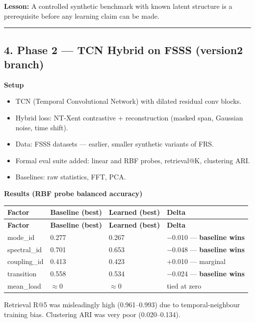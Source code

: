 \documentclass[11pt,a4paper]{article}
\begin{document}
\textbf{Lesson:} A controlled synthetic benchmark with known latent structure is a prerequisite before
any learning claim can be made.

\vspace{4pt}\hrule\vspace{4pt}

\subsection{4. Phase 2 --- TCN Hybrid on FSSS (version2 branch)}

\textbf{Setup}
\begin{itemize}
  \item TCN (Temporal Convolutional Network) with dilated residual conv blocks.
  \item Hybrid loss: NT-Xent contrastive + reconstruction (masked span, Gaussian noise, time shift).
  \item Data: FSSS datasets --- earlier, smaller synthetic variants of FRS.
  \item Formal eval suite added: linear and RBF probes, retrieval@K, clustering ARI.
  \item Baselines: raw statistics, FFT, PCA.
\end{itemize}

\textbf{Results (RBF probe balanced accuracy)}

\begin{longtable}{|l|l|l|l|}
\hline
\textbf{Factor} & \textbf{Baseline (best)} & \textbf{Learned (best)} & \textbf{Delta} \\
\hline
\endfirsthead
\hline
\textbf{Factor} & \textbf{Baseline (best)} & \textbf{Learned (best)} & \textbf{Delta} \\
\hline
\endhead
\hline
\endfoot
mode\_id & 0.277 & 0.267 & $-$0.010 --- \textbf{baseline wins} \\
\hline
spectral\_id & 0.701 & 0.653 & $-$0.048 --- \textbf{baseline wins} \\
\hline
coupling\_id & 0.413 & 0.423 & +0.010 --- marginal \\
\hline
transition & 0.558 & 0.534 & $-$0.024 --- \textbf{baseline wins} \\
\hline
mean\_load & $\approx$0 & $\approx$0 & tied at zero \\
\hline
\end{longtable}

Retrieval R@5 was misleadingly high (0.961--0.993) due to temporal-neighbour training bias.
Clustering ARI was very poor (0.020--0.134).
\end{document}
